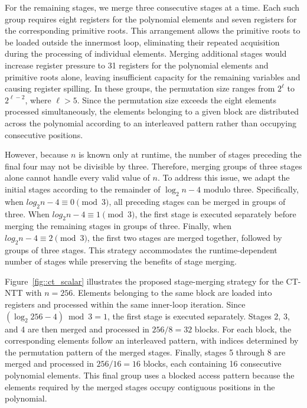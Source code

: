 For the remaining stages, we merge three consecutive stages at a time. Each such group requires eight registers for the polynomial elements and seven registers for the corresponding primitive roots. This arrangement allows the primitive roots to be loaded outside the innermost loop, eliminating their repeated acquisition during the processing of individual elements. Merging additional stages would increase register pressure to 31 registers for the polynomial elements and primitive roots alone, leaving insufficient capacity for the remaining variables and causing register spilling. In these groups, the permutation size ranges from \(2^\ell\) to \(2^{\ell-2}\), where \(\ell>5\). Since the permutation size exceeds the eight elements processed simultaneously, the elements belonging to a given block are distributed across the polynomial according to an interleaved pattern rather than occupying consecutive positions.

However, because \(n\) is known only at runtime, the number of stages preceding the final four may not be divisible by three. Therefore, merging groups of three stages alone cannot handle every valid value of \(n\). To address this issue, we adapt the initial stages according to the remainder of \(\log_2 n-4\) modulo three. Specifically, when \(log_2 n-4 \equiv 0 \pmod 3\), all preceding stages can be merged in groups of three. When \(log_2 n-4 \equiv 1 \pmod 3\), the first stage is executed separately before merging the remaining stages in groups of three. Finally, when \(log_2 n-4 \equiv 2 \pmod 3\), the first two stages are merged together, followed by groups of three stages. This strategy accommodates the runtime-dependent number of stages while preserving the benefits of stage merging.

Figure~\ref{fig::ct_scalar} illustrates the proposed stage-merging strategy for the CT-NTT with \(n=256\). Elements belonging to the same block are loaded into registers and processed within the same inner-loop iteration. Since \((\log_2 256-4)\bmod 3=1\), the first stage is executed separately. Stages 2, 3, and 4 are then merged and processed in \(256/8=32\) blocks. For each block, the corresponding elements follow an interleaved pattern, with indices determined by the permutation pattern of the merged stages. Finally, stages 5 through 8 are merged and processed in \(256/16=16\) blocks, each containing 16 consecutive polynomial elements. This final group uses a blocked access pattern because the elements required by the merged stages occupy contiguous positions in the polynomial.

